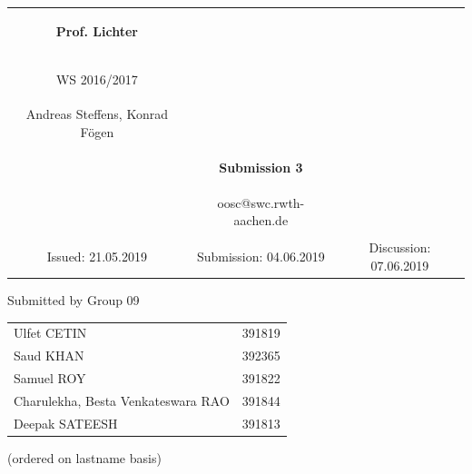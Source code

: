 \documentclass[a4paper,9pt,oneside]{scrreprt}
\begin{document}
\begin{tabular}{ccc}
	\begin{large} \textbf{Prof. Lichter} \end{large} &
	
	\begin{minipage}[H]{3.5cm}
	\centering
		\begin{large} OOSC \end{large} \\
		\begin{large} WS 2016/2017 \end{large}
	\end{minipage} &
	
	\begin{minipage}[H]{4cm}
	\end{minipage} \\
Andreas Steffens, Konrad F\"ogen &  &  \\
& \begin{huge} \textbf{Submission 3} \end{huge}&  \\
& oosc@swc.rwth-aachen.de &  \\
& & \\
Issued: 21.05.2019 &
Submission: 04.06.2019 &
Discussion:  07.06.2019 \\
\end{tabular}
\newline \newline \newline

\begin{center}
	Submitted by Group 09
	
	\bigskip
	
	\begin{tabular}{ll}
		Ulfet CETIN & 391819 \\
		Saud KHAN & 392365  \\
		Samuel ROY & 391822 \\
		Charulekha, Besta Venkateswara RAO & 391844 \\
		Deepak SATEESH & 391813  \\
	\end{tabular}
	
	(ordered on lastname basis)
	
\end{center}


\setcounter{chapter}{3} %
	
\end{document}
